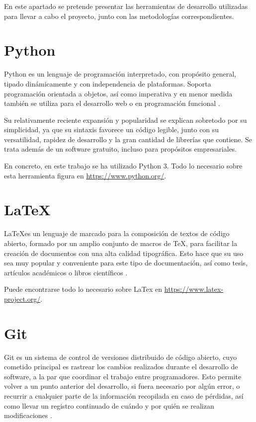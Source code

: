 
En este apartado se pretende presentar las herramientas de desarrollo utilizadas para llevar a cabo el proyecto, junto con las metodologías correspondientes.


\section{Python}

Python es un lenguaje de programación interpretado, con propósito general, tipado dinámicamente y con independencia de plataformas. Soporta programación orientada a objetos, así como imperativa y en menor medida también se utiliza para el desarrollo web o en programación funcional \cite{python}.

Su relativamente reciente expansión y popularidad se explican sobretodo por su simplicidad, ya que su sintaxis favorece un código legible, junto con su versatilidad, rapidez de desarrollo y la gran cantidad de librerías que contiene. Se trata además de un software gratuito, incluso para propósitos empresariales.

En concreto, en este trabajo se ha utilizado Python 3. Todo lo necesario sobre esta herramienta figura en \url{https://www.python.org/}.


\section{LaTeX}

\LaTeX es un lenguaje de marcado para la composición de textos de código abierto, formado por un amplio conjunto de macros de TeX, para facilitar la creación de documentos con una alta calidad tipográfica. Esto hace que su uso sea muy popular y conveniente para este tipo de documentación, así como tesis, artículos académicos o libros científicos \cite{wiki:latex}.

Puede encontrarse todo lo necesario sobre LaTex en \url{https://www.latex-project.org/}.


\section{Git}

Git es un sistema de control de versiones distribuido de código abierto, cuyo cometido principal es rastrear los cambios realizados durante el desarrollo de software, a la par que coordinar el trabajo entre programadores. Esto permite volver a un punto anterior del desarrollo, si fuera necesario por algún error, o recurrir a cualquier parte de la información recopilada en caso de pérdidas, así como llevar un registro continuado de cuándo y por quién se realizan modificaciones \cite{wiki:git}.

